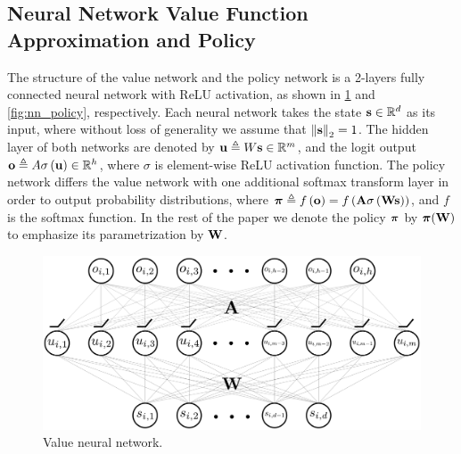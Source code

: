 \subsection{Neural Network Value Function Approximation and Policy}
\label{subsec:nn_value_policy}
The structure of the value network and the policy network  is a 2-layers fully connected neural network with ReLU activation, as shown in \cref{fig:nn_value} and \cref{fig:nn_policy}, respectively. 
Each neural network takes the state ${\mathbf{s}} \in {\mathbb{R}}^d$ as its input, where without loss of generality we assume that $\left\| {\mathbf{s}} \right\|_2 = 1$.
The hidden layer of both networks are denoted by ${\mathbf{u}}   \triangleq W{\mathbf{s}}\in{\mathbb{R}}^m$, and the logit output ${\mathbf{o}} \triangleq A\sigma\left( {\mathbf{u}}\right) \in {\mathbb{R}}^h$, where $\sigma$ is element-wise ReLU activation function. 
The policy network differs the value network with one additional softmax transform layer in order to output probability distributions, where ${\boldsymbol{\pi}} \triangleq f\left( {\mathbf{o}} \right) = f\left( {\mathbf{A}} \sigma\left( {\mathbf{W}} {\mathbf{s}} \right) \right)$, and $f$ is the softmax function. In the rest of the paper we denote the policy ${\boldsymbol{\pi}}$ by ${\boldsymbol{\pi}}({\mathbf{W}})$ to emphasize its parametrization by ${\mathbf{W}}$. 


\begin{figure}[t]
	\vskip 0.2in
	\begin{center}
		\centerline{\includegraphics[width=\columnwidth]{nn_value.pdf}}
		\caption{Value neural network.}
		\label{fig:nn_value}
	\end{center}
	\vskip -0.2in
\end{figure}

